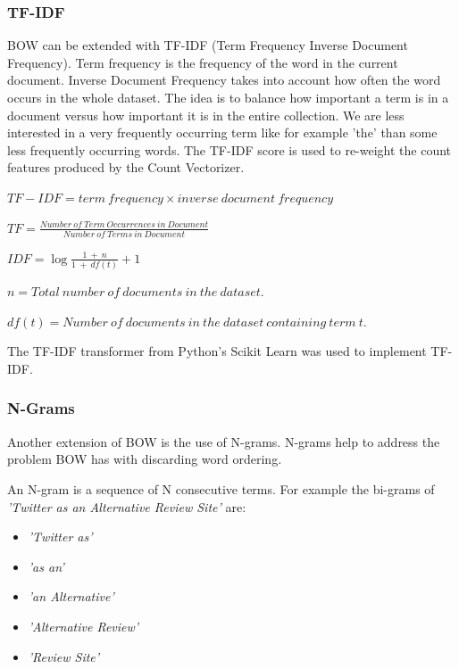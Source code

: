 \subsubsection{TF-IDF}

BOW can be extended with TF-IDF (Term Frequency Inverse Document Frequency). Term frequency is the frequency of the word in the current document. Inverse Document Frequency takes into account how often the word occurs in the whole dataset. The idea is to balance how important a term is in a document versus how important it is in the entire collection. We are less interested in a very frequently occurring term like for example 'the' than some less frequently occurring words. The TF-IDF score is used to re-weight the count features produced by the Count Vectorizer.

\begin{tcolorbox}[title=TF-IDF]
\begin{center}
$TF-IDF = term\ frequency \times inverse\ document\ frequency$ 

$TF = \frac{Number\ of\ Term\ Occurrences\ in\ Document}{Number\ of\ Terms\ in\ Document}$

$IDF = \log \frac{1\ +\ n}{1\ +\ df(t)} + 1$

$n = Total\ number\ of\ documents\ in\ the\ dataset.$

$df(t) = Number\ of\ documents\ in\ the\ dataset\ containing\ term\ t.$
\end{center}
\end{tcolorbox}
The TF-IDF transformer from Python's Scikit Learn was used to implement TF-IDF.


\subsubsection*{N-Grams}

Another extension of BOW is the use of N-grams. N-grams help to address the problem BOW has with discarding word ordering.

An N-gram is a sequence of N consecutive terms. For example the bi-grams of \emph{'Twitter as an Alternative Review Site'} are:
\begin{itemize}
    \item \emph{'Twitter as'}
    \item \emph{'as an'}
    \item \emph{'an Alternative'}
    \item \emph{'Alternative Review'}
    \item \emph{'Review Site'}
\end{itemize}


